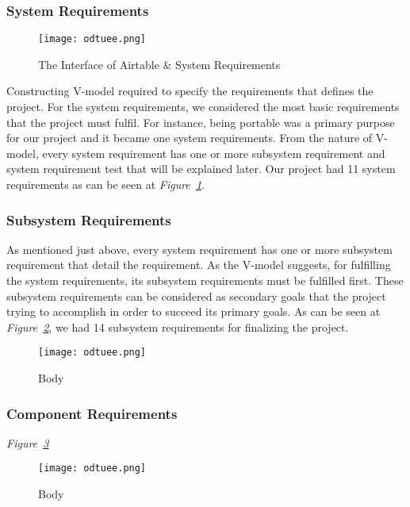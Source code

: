 \subsubsection{System Requirements}
\begin{figure}[H]
\texttt{[image: odtuee.png]}\\[1cm]
\caption{\label{fig:asr}The Interface of Airtable \& System Requirements }
\end{figure}
\-
\indent Constructing V-model required to specify the requirements that defines the project. For the system requirements, we considered the most basic requirements that the project must fulfil. For instance, being portable was a primary purpose for our project and it became one system requirements. From the nature of V-model, every system requirement has one or more subsystem requirement and system requirement test that will be explained later. Our project had 11 system requirements as can be seen at \textit{Figure~\ref{fig:asr}}.

\subsubsection{Subsystem Requirements}
\- \indent
	As mentioned just above, every system requirement has one or more subsystem requirement that detail the requirement. As the V-model suggests, for fulfilling the system requirements, its subsystem requirements must be fulfilled first. These subsystem requirements can be considered as secondary goals that the project trying to accomplish in order to succeed its primary goals. As can be seen at \textit{Figure~\ref{fig:ssr}}, we had 14 subsystem requirements for finalizing the project.
\begin{figure}[H]
\texttt{[image: odtuee.png]}\\[1cm]
\caption{\label{fig:ssr}Body }
\end{figure}


\subsubsection{Component Requirements}

\textit{Figure~\ref{fig:cr}}

\begin{figure}[H]

\texttt{[image: odtuee.png]}\\[1cm]
\caption{\label{fig:cr}Body }
\end{figure}
 
